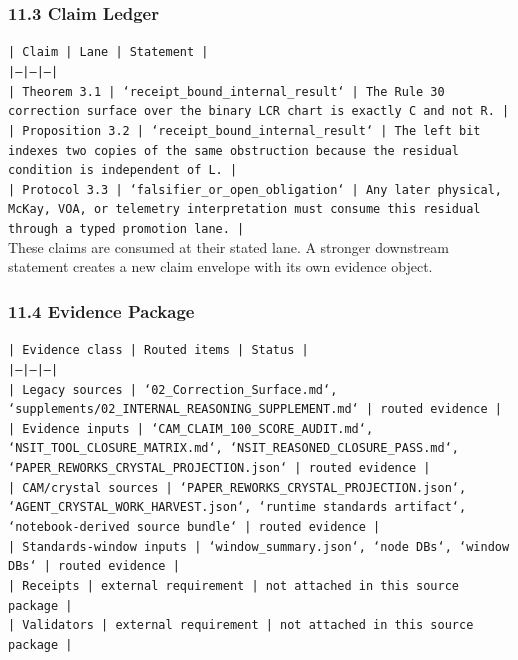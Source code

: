\documentclass[11pt]{article}
\begin{document}
\subsubsection*{11.3 Claim Ledger}

\noindent\texttt{| Claim | Lane | Statement |}\\
\noindent\texttt{|---|---|---|}\\
\noindent\texttt{| Theorem 3.1 | `receipt\_bound\_internal\_result` | The Rule 30 correction surface over the binary LCR chart is exactly C and not R. |}\\
\noindent\texttt{| Proposition 3.2 | `receipt\_bound\_internal\_result` | The left bit indexes two copies of the same obstruction because the residual condition is independent of L. |}\\
\noindent\texttt{| Protocol 3.3 | `falsifier\_or\_open\_obligation` | Any later physical, McKay, VOA, or telemetry interpretation must consume this residual through a typed promotion lane. |}\\

These claims are consumed at their stated lane. A stronger downstream statement
creates a new claim envelope with its own evidence object.

\subsubsection*{11.4 Evidence Package}

\noindent\texttt{| Evidence class | Routed items | Status |}\\
\noindent\texttt{|---|---|---|}\\
\noindent\texttt{| Legacy sources | `02\_Correction\_Surface.md`, `supplements/02\_INTERNAL\_REASONING\_SUPPLEMENT.md` | routed evidence |}\\
\noindent\texttt{| Evidence inputs | `CAM\_CLAIM\_100\_SCORE\_AUDIT.md`, `NSIT\_TOOL\_CLOSURE\_MATRIX.md`, `NSIT\_REASONED\_CLOSURE\_PASS.md`, `PAPER\_REWORKS\_CRYSTAL\_PROJECTION.json` | routed evidence |}\\
\noindent\texttt{| CAM/crystal sources | `PAPER\_REWORKS\_CRYSTAL\_PROJECTION.json`, `AGENT\_CRYSTAL\_WORK\_HARVEST.json`, `runtime standards artifact`, `notebook-derived source bundle` | routed evidence |}\\
\noindent\texttt{| Standards-window inputs | `window\_summary.json`, `node DBs`, `window DBs` | routed evidence |}\\
\noindent\texttt{| Receipts | external requirement | not attached in this source package |}\\
\noindent\texttt{| Validators | external requirement | not attached in this source package |}\\
\end{document}
